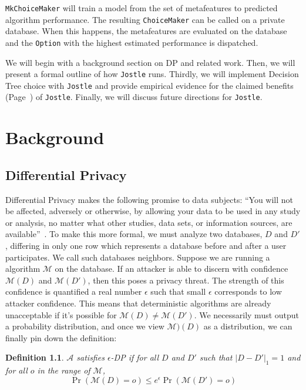 \documentclass[11pt]{report}
\newtheorem{defn}{Definition}
\newcommand{\Jostle}{\texttt{Jostle}}
\renewcommand{\t}[1]{\texttt{#1}}
\begin{document}
\t{MkChoiceMaker} will train a model from the set of metafeatures to predicted algorithm performance. The resulting \t{ChoiceMaker} can be called on a private database. When this happens, the metafeatures are evaluated on the database and the \t{Option} with the highest estimated performance is dispatched.

We will begin with a background section on DP and related work. Then, we will present a formal outline of how \Jostle{} runs. Thirdly, we will implement Decision Tree choice with \Jostle{} and provide empirical evidence for the claimed benefits (Page~\pageref{itm:adv_correct}) of \Jostle{}. Finally, we will discuss future directions for \Jostle{}.

\chapter{Background}
\section{Differential Privacy}
Differential Privacy makes the following promise to data subjects: ``You will not be affected, adversely or otherwise, by allowing your data to be used in any study or analysis, no matter what other studies, data sets, or information sources, are available''~\cite{Dwork:2006}. To make this more formal, we must analyze two databases, $D$ and $D'$, differing in only one row which represents a database before and after a user participates. We call such databases neighbors. Suppose we are running a algorithm $\mathcal{M}$ on the database. If an attacker is able to discern with confidence $\mathcal{M}(D)$ and $\mathcal{M}(D')$, then this poses a privacy threat. The strength of this confidence is quantified a real number $\epsilon$ such that small $\epsilon$ corresponds to low attacker confidence. This means that deterministic algorithms are already unacceptable if it's possible for $\mathcal{M}(D) \neq \mathcal{M}(D')$. We necessarily must output a probability distribution, and once we view $\mathcal{M})(D)$ as a distribution, we can finally pin down the definition:

\begin{defn}
$\mathcal{A}$ satisfies $\epsilon$-DP if for all $D$ and $D'$ such that $|D-D'|_1=1$ and for all $o$ in the range of $\mathcal{M}$, 
\[\Pr\left(\mathcal{M}(D) = o \right) \leq e^{\epsilon} \Pr\left(\mathcal{M}(D')=o\right)\]
\end{defn}
\end{document}
